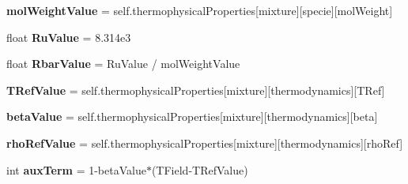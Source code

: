 \begin{DoxyCompactItemize}
{\bfseries mol\+Weight\+Value} = self.\+thermophysical\+Properties\mbox{[}\textquotesingle{}mixture\textquotesingle{}\mbox{]}\mbox{[}\textquotesingle{}specie\textquotesingle{}\mbox{]}\mbox{[}\textquotesingle{}mol\+Weight\textquotesingle{}\mbox{]}
\item 
\mbox{\label{classpy_f_v_m_1_1_foam_dictionaries_1_1_foam_dictionaries_af0824a64470b0b7d92dcb63f38805848}} 
float {\bfseries Ru\+Value} = 8.\+314e3
\item 
\mbox{\label{classpy_f_v_m_1_1_foam_dictionaries_1_1_foam_dictionaries_a2eb6bdd2d79b9b5f707586a3fa7457f2}} 
float {\bfseries Rbar\+Value} = Ru\+Value / mol\+Weight\+Value
\item 
\mbox{\label{classpy_f_v_m_1_1_foam_dictionaries_1_1_foam_dictionaries_af00e646a8bdebb0d75d4075108d86367}} 
{\bfseries T\+Ref\+Value} = self.\+thermophysical\+Properties\mbox{[}\textquotesingle{}mixture\textquotesingle{}\mbox{]}\mbox{[}\textquotesingle{}thermodynamics\textquotesingle{}\mbox{]}\mbox{[}\textquotesingle{}T\+Ref\textquotesingle{}\mbox{]}
\item 
\mbox{\label{classpy_f_v_m_1_1_foam_dictionaries_1_1_foam_dictionaries_a45959f57011db6e42230786ec240315c}} 
{\bfseries beta\+Value} = self.\+thermophysical\+Properties\mbox{[}\textquotesingle{}mixture\textquotesingle{}\mbox{]}\mbox{[}\textquotesingle{}thermodynamics\textquotesingle{}\mbox{]}\mbox{[}\textquotesingle{}beta\textquotesingle{}\mbox{]}
\item 
\mbox{\label{classpy_f_v_m_1_1_foam_dictionaries_1_1_foam_dictionaries_ab526cafa07919da82baa7e3f51f09ecd}} 
{\bfseries rho\+Ref\+Value} = self.\+thermophysical\+Properties\mbox{[}\textquotesingle{}mixture\textquotesingle{}\mbox{]}\mbox{[}\textquotesingle{}thermodynamics\textquotesingle{}\mbox{]}\mbox{[}\textquotesingle{}rho\+Ref\textquotesingle{}\mbox{]}
\item 
\mbox{\label{classpy_f_v_m_1_1_foam_dictionaries_1_1_foam_dictionaries_a3462f02a5872973149e8171668364f2c}} 
int {\bfseries aux\+Term} = 1-\/beta\+Value$\ast$(T\+Field-\/T\+Ref\+Value)
\end{DoxyCompactItemize}


